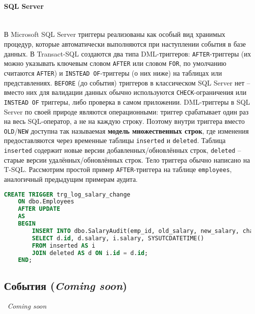  \paragraph{SQL Server} ~\\
 В Microsoft SQL Server триггеры реализованы как особый вид хранимых процедур, которые автоматически выполняются при наступлении события в базе данных. В Transact-SQL создаются два типа DML-триггеров: \texttt{AFTER}-триггеры (их можно указывать ключевым словом \texttt{AFTER} или словом \texttt{FOR}, по умолчанию считаются \texttt{AFTER}) и \texttt{INSTEAD OF}-триггеры (о них ниже) на таблицах или представлениях. \texttt{BEFORE} (до события) триггеров в классическом SQL Server нет – вместо них для валидации данных обычно используются \texttt{CHECK}-ограничения или \texttt{INSTEAD OF} триггеры, либо проверка в самом приложении. DML-триггеры в SQL Server по своей природе являются операционными: триггер срабатывает один раз на весь SQL-оператор, а не на каждую строку. Поэтому внутри триггера вместо \texttt{OLD}/\texttt{NEW} доступна так называемая \textbf{модель множественных строк}, где изменения предоставляются через временные таблицы \texttt{inserted} и \texttt{deleted}. Таблица \texttt{inserted} содержит новые версии добавленных/обновлённых строк, \texttt{deleted} – старые версии удалённых/обновлённых строк. Тело триггера обычно написано на T-SQL. Рассмотрим простой пример \texttt{AFTER}-триггера на таблице \texttt{employees}, аналогичный предыдущим примерам аудита.

 \begin{lstlisting}[language=SQL]
    CREATE TRIGGER trg_log_salary_change
    ON dbo.Employees
    AFTER UPDATE
    AS
    BEGIN
        INSERT INTO dbo.SalaryAudit(emp_id, old_salary, new_salary, changed_at)
        SELECT d.id, d.salary, i.salary, SYSUTCDATETIME()
        FROM inserted AS i
        JOIN deleted AS d ON i.id = d.id;
    END;
 \end{lstlisting}









\subsection{События (\textit{Coming soon})}

\textit{~Coming soon}





